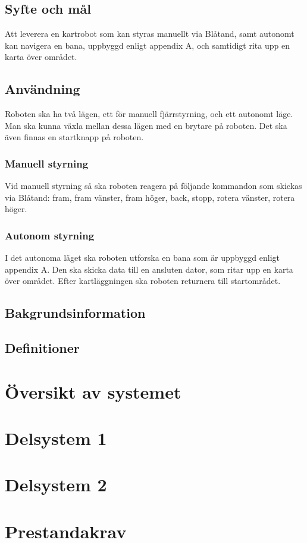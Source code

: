\documentclass[a4paper,11pt]{article}
\begin{document}
\subsection{Syfte och mål}
Att leverera en kartrobot som kan styras manuellt via Blåtand, samt autonomt kan navigera en bana, uppbyggd enligt appendix A, och samtidigt rita upp en karta över området.  
\subsection{Användning}
Roboten ska ha två lägen, ett för manuell fjärrstyrning, och ett autonomt läge. Man ska kunna växla mellan dessa lägen med en brytare på roboten. Det ska även finnas en startknapp på roboten. 
\subsubsection{Manuell styrning}
Vid manuell styrning så ska roboten reagera på följande kommandon som skickas via Blåtand: fram, fram vänster, fram höger, back, stopp, rotera vänster, rotera höger. 
\subsubsection{Autonom styrning}
I det autonoma läget ska roboten utforska en bana som är uppbyggd enligt appendix A. Den ska skicka data till en ansluten dator, som ritar upp en karta över området. Efter kartläggningen ska roboten returnera till startområdet. 
\subsection{Bakgrundsinformation}
\subsection{Definitioner}

\section{Översikt av systemet}
\section{Delsystem 1}
\section{Delsystem 2}
\section{Prestandakrav}
\end{document}
